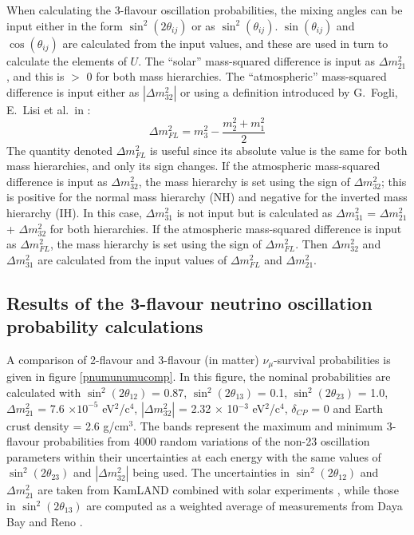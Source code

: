When calculating the 3-flavour oscillation probabilities, the mixing angles can be input either in the form $\sin^{2}(2 \theta_{ij})$ 
or as $\sin^{2}(\theta_{ij})$. $\sin(\theta_{ij})$ and $\cos(\theta_{ij})$ are calculated from the input values, and these are used in 
turn to calculate the elements of $U$. The ``solar'' mass-squared difference is input as $\Delta m_{21}^{2}$, and this is $>$ 0 for 
both mass hierarchies. The ``atmospheric'' 
mass-squared difference is input either as $|\Delta m_{32}^{2}|$ or using a definition introduced by G.\ Fogli, E.\ Lisi et al.\ in 
\cite{LisiGlobalAnalysis}:
\begin{equation}
\Delta m^{2}_{FL} = m_{3}^{2} - \frac{m_{2}^{2} + m_{1}^{2}}{2}
\end{equation}
The quantity denoted $\Delta m^{2}_{FL}$ is useful since its absolute value is the same for both mass hierarchies, and only its sign 
changes. If the atmospheric mass-squared difference is input as $\Delta m^{2}_{32}$, the mass hierarchy is set using the sign of 
$\Delta m_{32}^{2}$; this is positive for the normal mass hierarchy (NH) and negative for the inverted mass hierarchy (IH). In this case, 
$\Delta m_{31}^{2}$ is not input but is calculated as $\Delta m_{31}^{2}$ = $\Delta m_{21}^{2}$ + $\Delta m_{32}^{2}$ for both hierarchies.
If the atmospheric mass-squared difference is input as $\Delta m^{2}_{FL}$, the mass hierarchy is set using the sign of $\Delta m^{2}_{FL}$. 
Then $\Delta m_{32}^{2}$ and $\Delta m_{31}^{2}$ are calculated from the input values of $\Delta m^{2}_{FL}$ and $\Delta m_{21}^{2}$.

\subsection{Results of the 3-flavour neutrino oscillation probability calculations}
\label{3flavourresults}

A comparison of 2-flavour and 3-flavour (in matter) $\nu_{\mu}$-survival probabilities is given in figure \ref{pnumunumucomp}. 
In this figure, the nominal probabilities are calculated with $\sin^{2}(2 \theta_{12})$ = 0.87, $\sin^{2}(2 \theta_{13})$ = 0.1,
$\sin^{2}(2 \theta_{23})$ = 1.0, $\Delta m_{21}^{2}$ = 7.6 $\times 10^{-5}$  eV$^{2}$/c$^{4}$, $|\Delta m_{32}^{2}|$ = 2.32 $\times$ 10$^{-3}$ eV$^{2}$/c$^{4}$,
$\delta_{CP}$ = 0 and Earth crust density = 2.6 g/cm$^{3}$. The bands represent the maximum and minimum 3-flavour probabilities from 4000 random
variations of the non-23 oscillation parameters within their uncertainties at each energy with the same values of $\sin^{2}(2 \theta_{23})$ and
$|\Delta m_{32}^{2}|$ being used. The uncertainties in $\sin^{2}(2 \theta_{12})$ and $\Delta m_{21}^{2}$ are taken from KamLAND combined
with solar experiments \cite{Kamland}, while those in $\sin^{2}(2 \theta_{13})$ are computed as a weighted average of measurements from Daya Bay
\cite{DayaBay} and Reno \cite{Reno}.

